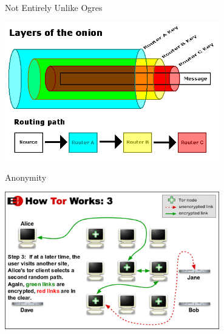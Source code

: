 \documentclass{beamer}
\begin{document}
	\begin{frame}{Not Entirely Unlike Ogres}
		\begin{center}
			\includegraphics[width=0.7\textwidth]{layers.png}
		\end{center}
	\end{frame}
	\begin{frame}{Anonymity}
		\begin{center}
			\includegraphics[width=0.7\textwidth]{htw3.png}
		\end{center}
	\end{frame}
\end{document}
